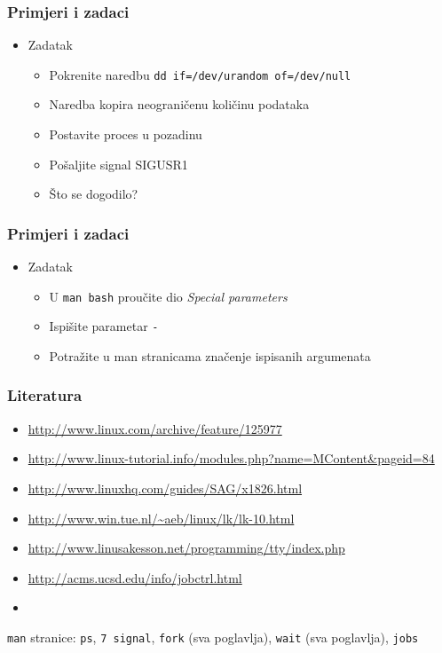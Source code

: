 \documentclass[table,usenames,dvipsnames]{beamer}
\newcommand{\shell}[1]{\texttt{#1}}
\begin{document}
\begin{frame}[t]
	\frametitle{Primjeri i zadaci}
	\begin{itemize}
		\item Zadatak
		\begin{itemize}
			\item Pokrenite naredbu \shell{dd if=/dev/urandom of=/dev/null}
			\item Naredba kopira neograničenu količinu podataka
			\item Postavite proces u pozadinu
			\item Pošaljite signal SIGUSR1
			\item Što se dogodilo?
		\end{itemize}
	\end{itemize}
\end{frame}

\begin{frame}[t]
	\frametitle{Primjeri i zadaci}
	\begin{itemize}
		\item Zadatak
		\begin{itemize}
			\item U \shell{man bash} proučite dio \emph{Special parameters}
			\item Ispišite parametar \shell{-}
			\item Potražite u man stranicama značenje ispisanih argumenata
		\end{itemize}
	\end{itemize}
\end{frame}

\begin{frame}[t]
	\frametitle{Literatura}
	\begin{itemize}
	  \item \url{http://www.linux.com/archive/feature/125977}
	  \item \url{http://www.linux-tutorial.info/modules.php?name=MContent&pageid=84}
	  \item \url{http://www.linuxhq.com/guides/SAG/x1826.html}
	  \item \url{http://www.win.tue.nl/~aeb/linux/lk/lk-10.html}
	  \item \url{http://www.linusakesson.net/programming/tty/index.php}\\
	  \item \url{http://acms.ucsd.edu/info/jobctrl.html}
	  \item[]
	\end{itemize}
	\shell{man} stranice: \shell{ps}, \shell{7 signal}, \shell{fork} (sva poglavlja), \shell{wait} (sva poglavlja), \shell{jobs}
\end{frame}
\end{document}
